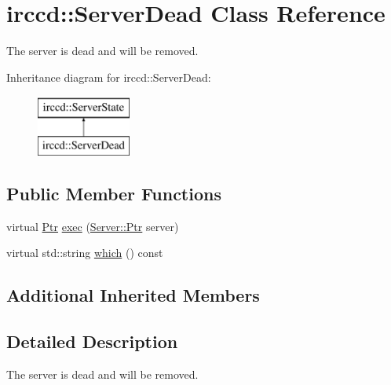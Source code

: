 \hypertarget{a00057}{\section{irccd\-:\-:Server\-Dead Class Reference}
\label{a00057}
}


The server is dead and will be removed.  


Inheritance diagram for irccd\-:\-:Server\-Dead\-:\begin{figure}[H]
\begin{center}
\leavevmode
\includegraphics[height=2.000000cm]{a00057}
\end{center}
\end{figure}
\subsection*{Public Member Functions}
\begin{DoxyCompactItemize}
\item 
virtual \hyperlink{a00060_aa1d1595a1abc377d310f06145103d7d3}{Ptr} \hyperlink{a00057_a4f66639b0a1f431e1145e1194e000a7b}{exec} (\hyperlink{a00055_aea3f9694df81348b909814ac6f84f874}{Server\-::\-Ptr} server)
\begin{DoxyCompactList}\small\item\em \end{DoxyCompactList}\item 
virtual std\-::string \hyperlink{a00057_a5e27f9746100d245c1833f006fc47908}{which} () const 
\begin{DoxyCompactList}\small\item\em \end{DoxyCompactList}\end{DoxyCompactItemize}
\subsection*{Additional Inherited Members}


\subsection{Detailed Description}
The server is dead and will be removed. 

